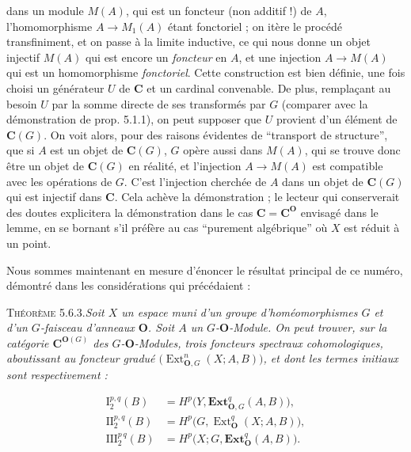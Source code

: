 \clearpage
{}

\noindent dans un module $M(A)$, qui est un foncteur (non additif !) de $A$,
l'homomorphisme $A\to M_1(A)$ étant fonctoriel ; on itère le
procédé transfiniment, et on passe à la limite inductive, ce qui nous donne un
objet injectif $M(A)$ qui est encore un \textit{foncteur} en $A$, et une injection
$A\to M(A)$ qui est un homomorphisme \textit{fonctoriel}. Cette
construction est bien définie, une fois choisi un générateur $U$ de ${\mathbf C}$ et un
cardinal convenable. De plus, remplaçant au besoin $U$ par la somme directe de
ses transformés par $G$ (comparer avec la démonstration de prop. 5.1.1), on
peut supposer que $U$ provient d'un élément de ${\mathbf C}(G)$. On voit alors, pour des
raisons évidentes de ``transport de structure'', que si $A$ est un objet de
${\mathbf C}(G)$, $G$ opère aussi dans $M(A)$, qui se trouve donc être un objet de
${\mathbf C}(G)$ en réalité, et l'injection $A\to M(A)$ est compatible avec
les opérations de $G$. C'est l'injection cherchée de $A$ dans un objet de
${\mathbf C}(G)$ qui est injectif dans ${\mathbf C}$.
Cela achève la démonstration ; le lecteur qui conserverait des doutes
explicitera la démonstration dans le cas ${\mathbf C}={\mathbf C}^{\mathbf O}$ envisagé dans le lemme, en se
bornant s'il préfère au cas ``purement algébrique'' où $X$ est réduit à un
point.

Nous sommes maintenant en mesure d'énoncer le résultat principal de ce
numéro, démontré dans les considérations qui précédaient :

\textsc{Théorème 5.6.3.}\quad \textit{Soit $X$ un espace muni d'un
groupe d'homéomorphismes $G$ et d'un $G$-faisceau d'anneaux ${\mathbf O}$. Soit $A$ un
$G$-${\mathbf O}$-Module. On peut trouver, sur la catégorie ${\mathbf C}^{{\mathbf O}(G)}$ des
$G$-${\mathbf O}$-Modules, trois foncteurs spectraux cohomologiques, aboutissant au
foncteur gradué $\bigl(\operatorname{Ext}_{{\mathbf O},G}^n(X;A,B)\bigr)$, et dont les
termes initiaux sont respectivement :}

\begin{equation}
\begin{aligned}
\mathrm I_2^{p,q}(B)
  &=H^p\bigl(Y,\mathbf{Ext}_{{\mathbf O},G}^q(A,B)\bigr),\\
\mathrm {II}_2^{p,q}(B)
  &=H^p\bigl(G,\operatorname{Ext}_{\mathbf O}^q(X;A,B)\bigr),\\
\mathrm {III}_2^{p\,q}(B)
  &=H^p\bigl(X;G,\mathbf{Ext}_{\mathbf O}^q(A,B)\bigr).
\end{aligned}
\tag{5.6.11}
\end{equation}

